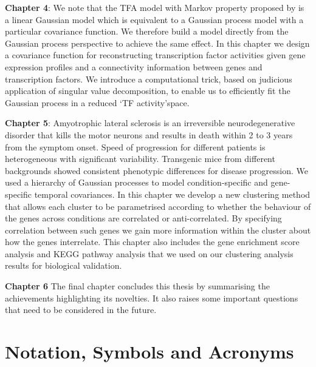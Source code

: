 \textbf{Chapter 4}: We note that the TFA model with Markov property proposed by \cite{Sanguinetti:2006} is a linear Gaussian model which is equivalent to a Gaussian process model with a particular covariance function. We therefore build a model directly from the Gaussian process perspective to achieve the same effect. In this chapter we design a covariance function for reconstructing transcription factor activities given gene expression profiles and a connectivity information between genes and transcription factors. We introduce a computational trick, based on  judicious application of singular value decomposition, to enable us to efficiently fit the Gaussian process in a reduced \lq TF activity\rq space. 

\textbf{Chapter 5}:
Amyotrophic lateral sclerosis is an irreversible neurodegenerative disorder that kills the motor neurons and results in death within 2 to 3 years from the symptom onset.  Speed of progression for different patients is heterogeneous with significant variability. Transgenic mice from different backgrounds showed consistent phenotypic differences for disease progression. We used a hierarchy of Gaussian processes to model condition-specific and gene-specific temporal covariances. In this chapter we develop a new clustering method that allows each cluster to be parametrised according to whether the behaviour of the genes across conditions are correlated or anti-correlated. By specifying correlation between such genes we gain more information within the cluster about how the genes interrelate. This chapter also includes the gene enrichment score analysis and KEGG pathway analysis that we used on our clustering analysis results for biological validation.

\textbf{Chapter 6}
The final chapter concludes this thesis by summarising the achievements highlighting its novelties. It also raises some important questions that need to be considered in the future.


\section{Notation, Symbols and Acronyms}

